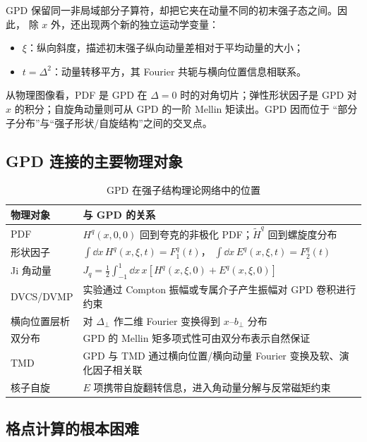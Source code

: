 \documentclass[12pt,a4paper]{ctexart}
\theoremstyle{definition}
\begin{document}
GPD 保留同一非局域部分子算符，却把它夹在动量不同的初末强子态之间。因此，
除 $x$ 外，还出现两个新的独立运动学变量：
\begin{itemize}[leftmargin=*]
  \item $\xi$：纵向斜度，描述初末强子纵向动量差相对于平均动量的大小；
  \item $t=\Delta^2$：动量转移平方，其 Fourier 共轭与横向位置信息相联系。
\end{itemize}

从物理图像看，PDF 是 GPD 在 $\Delta=0$ 时的对角切片；弹性形状因子是 GPD
对 $x$ 的积分；自旋角动量则可从 GPD 的一阶 Mellin 矩读出。GPD 因而位于
“部分子分布”与“强子形状/自旋结构”之间的交叉点。

\subsection{GPD 连接的主要物理对象}

\begin{table}[H]
\centering
\small
\caption{GPD 在强子结构理论网络中的位置}
\label{tab:gpd-network}
\begin{tabularx}{\textwidth}{lX}
\toprule
物理对象 & 与 GPD 的关系 \\
\midrule
PDF & $H^q(x,0,0)$ 回到夸克的非极化 PDF；$\widetilde H^q$ 回到螺旋度分布 \\
形状因子 & $\int \dd x\,H^q(x,\xi,t)=F_1^q(t)$，
$\int \dd x\,E^q(x,\xi,t)=F_2^q(t)$ \\
Ji 角动量 & $J_q=\frac12\int_{-1}^{1}\dd x\,x[H^q(x,\xi,0)+E^q(x,\xi,0)]$ \\
DVCS/DVMP & 实验通过 Compton 振幅或专属介子产生振幅对 GPD 卷积进行约束 \\
横向位置层析 & 对 $\Delta_\perp$ 作二维 Fourier 变换得到 $x$--$b_\perp$ 分布 \\
双分布 & GPD 的 Mellin 矩多项式性可由双分布表示自然保证 \\
TMD & GPD 与 TMD 通过横向位置/横向动量 Fourier 变换及软、演化因子相关联 \\
核子自旋 & $E$ 项携带自旋翻转信息，进入角动量分解与反常磁矩约束 \\
\bottomrule
\end{tabularx}
\end{table}

\subsection{格点计算的根本困难}
\end{document}
